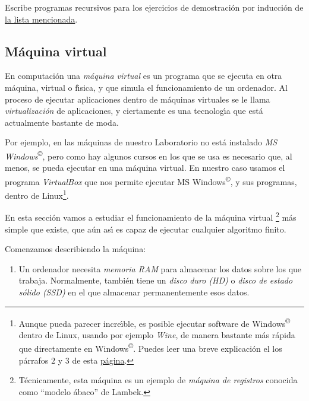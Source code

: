 \begin{enumerate}
{\sc Escribe programas recursivos} para los ejercicios de demostraci\'on por
inducci\'on de \hyperref[rec]{la lista mencionada}.





\end{enumerate}



\begin{appendices}
\chapter{M\'aquina virtual}
En computaci\'on una {\itshape m\'aquina virtual} es un programa que se ejecuta
en otra m\'aquina, virtual o f\'{\i}sica, y que simula el funcionamiento de un 
ordenador. Al proceso de ejecutar aplicaciones dentro de m\'aquinas virtuales 
se le llama {\itshape virtualizaci\'on} de aplicaciones, y ciertamente es una
tecnolog\'{\i}a que est\'a actualmente bastante de moda.

Por ejemplo, en las m\'aquinas de nuestro  Laboratorio no est\'a
instalado 
{\itshape MS Windows}\textsuperscript{\tiny\copyright},  pero como hay algunos
cursos en los que se usa es necesario que, al menos, se pueda ejecutar en una
m\'aquina virtual. En nuestro caso usamos el programa {\itshape VirtualBox} que
nos permite ejecutar MS Windows\textsuperscript{\tiny\copyright}, y sus
programas,  dentro de
Linux\footnote{Aunque pueda parecer incre\'{\i}ble, es posible ejecutar software
de Windows\textsuperscript{\tiny\copyright} dentro de Linux, usando por ejemplo
{\itshape Wine},  de manera
bastante m\'as r\'apida que directamente en 
Windows\textsuperscript{\tiny\copyright}. Puedes leer una breve
explicaci\'on el los p\'arrafos $2$ y $3$ de esta
\href{http://linux.about.com/od/softorther/a/softotherwine.htm}
{p\'agina}.}. 

En esta secci\'on vamos a estudiar el funcionamiento de la m\'aquina virtual
\footnote{T\'ecnicamente, esta m\'aquina es un ejemplo de {\itshape m\'aquina de
registros} conocida como ``modelo \'abaco'' de Lambek.}
m\'as simple que existe, que a\'un as\'{\i} es capaz de ejecutar cualquier
algoritmo finito. 

Comenzamos describiendo la m\'aquina:

\begin{enumerate}
 \item Un ordenador necesita {\itshape memoria RAM} para almacenar los datos
sobre los que trabaja. Normalmente, tambi\'en tiene un {\itshape disco duro
(HD)} 
o {\itshape disco de estado s\'olido (SSD)} en el que almacenar permanentemente
esos datos.


\end{enumerate}
\end{appendices}
